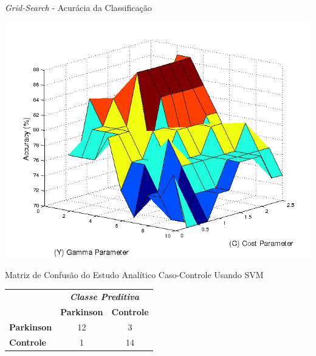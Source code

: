 \documentclass{beamer}
\begin{document}
\begin{frame}{\textit{Grid-Search} - Acurácia da Classificação}
  \begin{block}{}
  \center  
      \includegraphics[scale=0.4]{./img/gridsearch.png}      
  \end{block}
\end{frame}


\begin{frame}{Matriz de Confusão do Estudo Analítico Caso-Controle Usando SVM}
	\begin{block}{}
\begin{table}[!htbp]
		\label{table:resultadomatrizconfusaosvm}
		\centering
		\begin{tabular}{l|c|c|}
		\cline{2-3}
		\multicolumn{1}{c}{}                         & \multicolumn{2}{|c|}{\textit{\textbf{Classe Preditiva}}} \\ \cline{2-3} 
																								 & \textbf{Parkinson}      & \textbf{Controle}         \\ \hline
		\multicolumn{1}{|l|}{\textbf{Parkinson}} & 12       & 3           \\ \hline
		\multicolumn{1}{|l|}{\textbf{Controle}}     & 1           & 14     \\ \hline
		\end{tabular}
\end{table}
	\end{block}
\end{frame}
\end{document}
